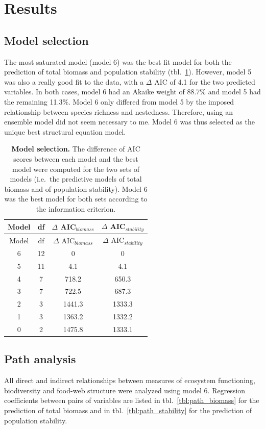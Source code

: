 \documentclass[11pt]{article}
\begin{document}
\hypertarget{results}{%
\section{Results}\label{results}}

\hypertarget{model-selection}{%
\subsection{Model selection}\label{model-selection}}

The most saturated model (model 6) was the best fit model for both the
prediction of total biomass and population stability
(tbl.~\ref{tbl:AIC}). However, model 5 was also a really good fit to the
data, with a \(\Delta\) AIC of 4.1 for the two predicted variables. In
both cases, model 6 had an Akaike weight of 88.7\% and model 5 had the
remaining 11.3\%. Model 6 only differed from model 5 by the imposed
relationship between species richness and nestedness. Therefore, using
an ensemble model did not seem necessary to me. Model 6 was thus
selected as the unique best structural equation model.

\hypertarget{tbl:AIC}{}
\begin{longtable}[]{@{}cccc@{}}
\caption{\label{tbl:AIC}\textbf{Model selection.} The difference of AIC
scores between each model and the best model were computed for the two
sets of models (i.e.~the predictive models of total biomass and of
population stability). Model 6 was the best model for both sets
according to the information criterion.}\tabularnewline
\toprule
Model & df & \(\Delta\) AIC\(_{biomass}\) & \(\Delta\)
AIC\(_{stability}\)\tabularnewline
\midrule
\endfirsthead
\toprule
Model & df & \(\Delta\) AIC\(_{biomass}\) & \(\Delta\)
AIC\(_{stability}\)\tabularnewline
\midrule
\endhead
6 & 12 & 0 & 0\tabularnewline
5 & 11 & 4.1 & 4.1\tabularnewline
4 & 7 & 718.2 & 650.3\tabularnewline
3 & 7 & 722.5 & 687.3\tabularnewline
2 & 3 & 1441.3 & 1333.3\tabularnewline
1 & 3 & 1363.2 & 1332.2\tabularnewline
0 & 2 & 1475.8 & 1333.1\tabularnewline
\bottomrule
\end{longtable}

\hypertarget{path-analysis}{%
\subsection{Path analysis}\label{path-analysis}}

All direct and indirect relationships between measures of ecosystem
functioning, biodiversity and food-web structure were analyzed using
model 6. Regression coefficients between pairs of variables are listed
in tbl.~\ref{tbl:path_biomass} for the prediction of total biomass and
in tbl.~\ref{tbl:path_stability} for the prediction of population
stability.
\end{document}
